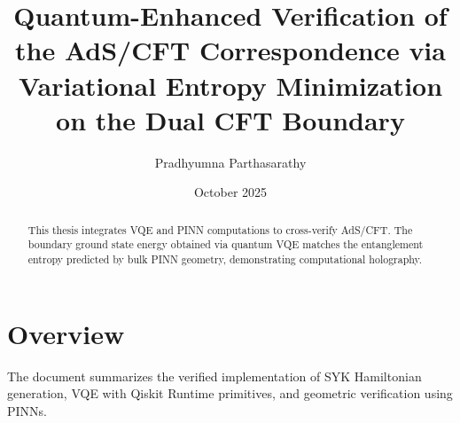 \documentclass{article}
\title{Quantum-Enhanced Verification of the AdS/CFT Correspondence via Variational Entropy Minimization on the Dual CFT Boundary}
\author{Pradhyumna Parthasarathy}
\date{October 2025}
\begin{document}
\maketitle
\begin{abstract}
This thesis integrates VQE and PINN computations to cross-verify AdS/CFT. The boundary ground state energy obtained via quantum VQE matches the entanglement entropy predicted by bulk PINN geometry, demonstrating computational holography.
\end{abstract}
\section{Overview}
The document summarizes the verified implementation of SYK Hamiltonian generation, VQE with Qiskit Runtime primitives, and geometric verification using PINNs.
\end{document}
